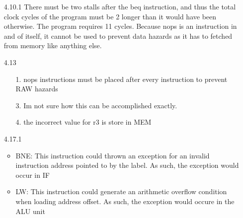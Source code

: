 \documentclass[]{3330hw}
\begin{document}
\begin{enumerate}
\item [4.10.1]
There must be two stalls after the beq instruction, and thus the total clock cycles of the program must be 2 longer than it would have been otherwise. The program requires 11 cycles.
Because nops is an instruction in and of itself, it cannot be used to prevent data hazards as it has to fetched from memory like anything else.

\item [4.13]
\begin{enumerate}
    \item [1.] nops instructions must be placed after every instruction to prevent RAW hazards
	\item [3.] Im not sure how this can be accomplished exactly.
	\item [4.] the incorrect value for r3 is store in MEM
\end{enumerate}

\item [4.17.1]
\begin{itemize}
	\item BNE: This instruction could thrown an exception for an invalid instruction address pointed to by the label. As such, the exception would occur in IF
	\item LW: This instruction could generate an arithmetic overflow condition when loading address offset. As such, the exception would occure in the ALU unit
	
\end{itemize}

\end{enumerate}
\end{document}
